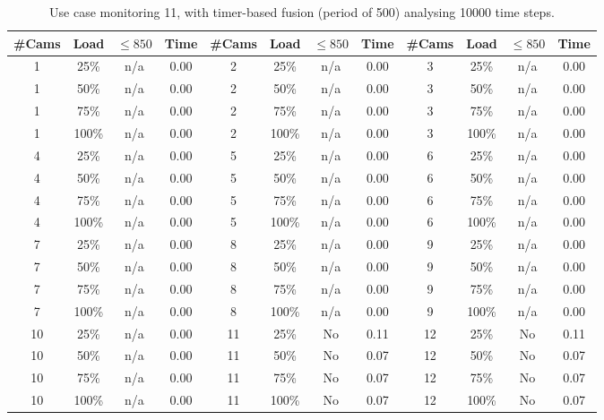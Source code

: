 \documentclass{article}
\begin{document}
\begin{table}
\centering
\begin{tabular}{|c|c|c|c|c|c|c|c|c|c|c|c|}
\hline
\#Cams & Load & $\leq 850$ & Time & \#Cams & Load & $\leq 850$ & Time & \#Cams & Load & $\leq 850$ & Time\\
\hline
1 & 25\% & n/a & 0.00 & 2 & 25\% & n/a & 0.00 & 3 & 25\% & n/a & 0.00\\
1 & 50\% & n/a & 0.00 & 2 & 50\% & n/a & 0.00 & 3 & 50\% & n/a & 0.00\\
1 & 75\% & n/a & 0.00 & 2 & 75\% & n/a & 0.00 & 3 & 75\% & n/a & 0.00\\
1 & 100\% & n/a & 0.00 & 2 & 100\% & n/a & 0.00 & 3 & 100\% & n/a & 0.00\\
\hline
4 & 25\% & n/a & 0.00 & 5 & 25\% & n/a & 0.00 & 6 & 25\% & n/a & 0.00\\
4 & 50\% & n/a & 0.00 & 5 & 50\% & n/a & 0.00 & 6 & 50\% & n/a & 0.00\\
4 & 75\% & n/a & 0.00 & 5 & 75\% & n/a & 0.00 & 6 & 75\% & n/a & 0.00\\
4 & 100\% & n/a & 0.00 & 5 & 100\% & n/a & 0.00 & 6 & 100\% & n/a & 0.00\\
\hline
7 & 25\% & n/a & 0.00 & 8 & 25\% & n/a & 0.00 & 9 & 25\% & n/a & 0.00\\
7 & 50\% & n/a & 0.00 & 8 & 50\% & n/a & 0.00 & 9 & 50\% & n/a & 0.00\\
7 & 75\% & n/a & 0.00 & 8 & 75\% & n/a & 0.00 & 9 & 75\% & n/a & 0.00\\
7 & 100\% & n/a & 0.00 & 8 & 100\% & n/a & 0.00 & 9 & 100\% & n/a & 0.00\\
\hline
10 & 25\% & n/a & 0.00 & 11 & 25\% & No & 0.11 & 12 & 25\% & No & 0.11\\
10 & 50\% & n/a & 0.00 & 11 & 50\% & No & 0.07 & 12 & 50\% & No & 0.07\\
10 & 75\% & n/a & 0.00 & 11 & 75\% & No & 0.07 & 12 & 75\% & No & 0.07\\
10 & 100\% & n/a & 0.00 & 11 & 100\% & No & 0.07 & 12 & 100\% & No & 0.07\\
\hline
\end{tabular}
\caption{Use case monitoring 11, with timer-based fusion (period of 500) analysing 10000 time steps.}
\end{table}
\end{document}
